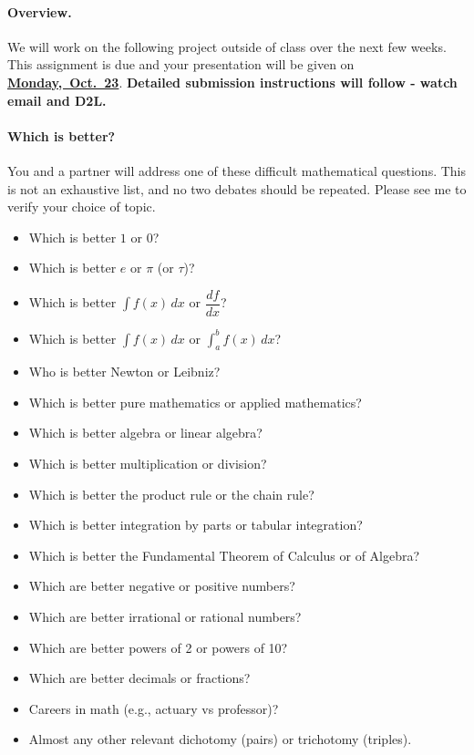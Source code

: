\documentclass[11pt]{article}
\newcommand{\compactlist}{\setlength{\itemsep}{0pt} \setlength{\parskip}{0pt} \setlength{\leftskip}{-1em}}
\begin{document}
\paragraph{Overview.} We will work on the following project outside of class over the next few weeks. This assignment is due and your presentation will be given on \textbf{\underline{{Monday,~Oct.~23}}}.  \textbf{Detailed submission instructions will follow - watch email and D2L.}

\paragraph{Which is better?} You and a partner will address one of these difficult mathematical questions.  This is not an exhaustive list, and no two debates should be repeated.  Please see me to verify your choice of topic.

\begin{itemize} \compactlist
\item Which is better \(1\) or \(0\)?
\item Which is better \(e\) or \(\pi\) (or \(\tau\))?
\item Which is better \(\displaystyle\int f(x)\,dx\) or \(\dfrac{df}{dx}\)?
\item Which is better \(\displaystyle\int f(x)\,dx\) or \(\displaystyle \int_a^b f(x)\, dx\)?
\item Who is better Newton or Leibniz?
\item Which is better pure mathematics or applied mathematics?
\item Which is better algebra or linear algebra?
\item Which is better multiplication or division?
\item Which is better the product rule or the chain rule?
\item Which is better integration by parts or tabular integration?
\item Which is better the Fundamental Theorem of Calculus or of Algebra?
\item Which are better negative  or positive numbers?
\item Which are better irrational or rational numbers?
\item Which are better powers of 2 or powers of 10?
\item Which are better decimals or fractions?
\item Careers in math (e.g., actuary vs professor)?
\item Almost any other relevant dichotomy (pairs) or trichotomy (triples).
\end{itemize}
%
\end{document}
